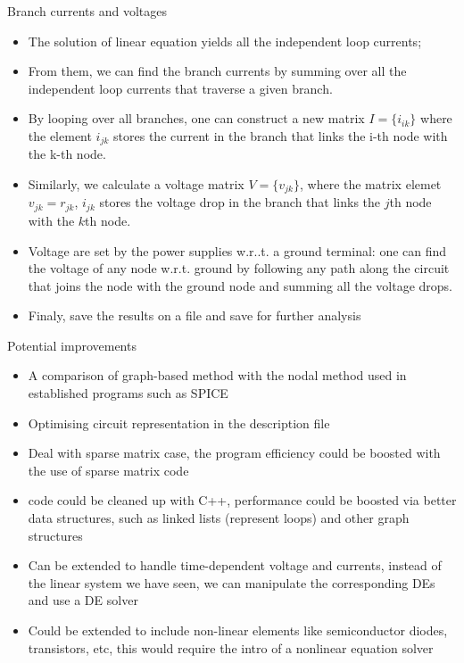 \documentclass[xcolor=dvipsnames]{beamer}
\begin{document}
\begin{frame}{Branch currents and voltages}
	\begin{itemize}
		\item The solution of linear equation yields all the independent loop currents;
		\item From them, we can find the branch currents by summing over all the independent loop currents that traverse a given branch.
		\item By looping over all branches, one can construct a new matrix $I=\{i_{ik}\}$ where the element $i_{jk}$ stores the current in the branch that links the i-th node with the k-th node.
		\item Similarly, we calculate a voltage matrix $V=\{v_{jk}\}$, where the matrix elemet $v_{jk} = r_{jk}$, $i_{jk}$ stores the voltage drop in the branch that links the $j$th node with the $k$th node.
		\item Voltage are set by the power supplies w.r..t. a ground terminal: one can find the voltage of any node w.r.t. ground by following any path along the circuit that joins the node with the ground node and summing all the voltage drops.
		\item Finaly, save the results on a file and save for further analysis
	\end{itemize}
\end{frame}

\begin{frame}{ Potential improvements}
	\begin{itemize}
		\item A comparison of graph-based method with the nodal method used in established programs such as SPICE
		\item Optimising circuit representation in the description file
		\item Deal with sparse matrix case, the program efficiency could be boosted with the use of sparse matrix code
		\item code could be cleaned up with C++, performance could be boosted via better data structures, such as linked lists (represent loops) and other graph structures
		\item Can be extended to handle time-dependent voltage and currents, instead of the linear system we have seen, we can manipulate the corresponding DEs and use a DE solver
		\item Could be extended to include non-linear elements like semiconductor diodes, transistors, etc, this would require the intro of a nonlinear equation solver
	\end{itemize}
\end{frame}
\end{document}
